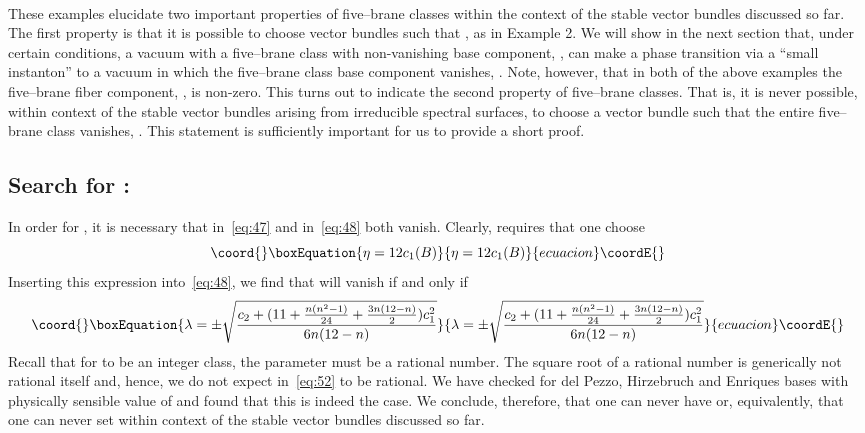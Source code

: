 \documentclass[a4paper,12pt]{article}
\numberwithin{equation}{section}
\def\cN{{\mathcal N}}
\theoremstyle{plain}
\begin{document}
\smallskip

\

These examples elucidate two important properties of five--brane classes
\coordHE{} within the context of the stable \coordHE{} vector bundles discussed so
far. The first property is that it is possible to choose vector bundles such
that \coordHE{}, as in Example 2. We will show in the next section that, 
under certain conditions, a vacuum with a five--brane 
class with non-vanishing base component, \coordHE{}, can make a phase
transition via a ``small instanton'' to a vacuum in which the five--brane 
class base component vanishes, \coordHE{}. Note, however, that 
in both of the above examples the five--brane
fiber component, \coordHE{}, is non-zero. This turns out to indicate the second
property of five--brane classes. That is, it is never possible, 
within context of the stable \coordHE{} vector bundles arising from 
irreducible spectral surfaces,  
to choose a vector bundle such that the entire five--brane class vanishes,
\coordHE{}. This statement is sufficiently important for us to provide a short
proof.

\subsection*{Search for \coordHE{}:}

In order for \coordHE{}, it is necessary that \coordHE{} in~\eqref{eq:47} and
\coordHE{} in~\eqref{eq:48} both vanish. Clearly, \coordHE{} requires that
one choose 
\begin{equation}\coord{}\boxEquation{
\eta=12c_{1}(B)
\label{eq:51}
}{
\eta=12c_{1}(B)
}{ecuacion}\coordE{}\end{equation}
Inserting this expression into~\eqref{eq:48}, we find that \coordHE{}
will vanish if 
and only if
\begin{equation}\coord{}\boxEquation{
\lambda=\pm\sqrt{\frac{c_{2}+(11+\frac{n(n^{2}-1)}{24}
+\frac{3n(12-n)}{2})c_{1}^{2}}{6n(12-n)}}
\label{eq:52}
}{
\lambda=\pm\sqrt{\frac{c_{2}+(11+\frac{n(n^{2}-1)}{24}
+\frac{3n(12-n)}{2})c_{1}^{2}}{6n(12-n)}}
}{ecuacion}\coordE{}\end{equation}
Recall that for \myHighlight{$c_{1}(\cN)$}\coordHE{} to be an integer class, the parameter \myHighlight{$\lambda$}\coordHE{} must
be a rational number. The square root of a rational number is generically not
rational itself and, hence, we do not expect \myHighlight{$\lambda$}\coordHE{} in~\eqref{eq:52} to be
rational. We have checked for del Pezzo, Hirzebruch and Enriques bases with
physically sensible value of \coordHE{} and found that this is indeed the case. We
conclude, therefore, that one can never have \coordHE{} or, equivalently,
that one can never set \coordHE{} within context of the 
stable \coordHE{} vector bundles discussed so far.
\end{document}
